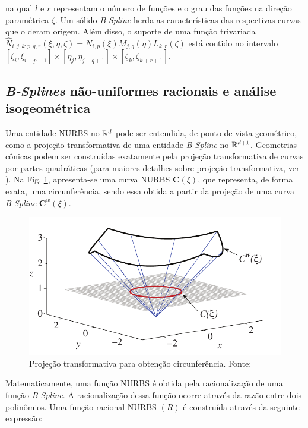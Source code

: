 \documentclass[tese_patricia]{subfiles}
\begin{document}
\noindent na qual $l$ e $r$ representam o número de funções e o grau das funções na direção paramétrica $\zeta$. Um sólido \textit{B-Spline} herda as características das respectivas curvas que o deram origem. Além disso, o suporte de uma função trivariada $\hat{N}_{i,j,k:p,q,r}\left(\xi,\eta,\zeta\right) = N_{i,p}(\xi)M_{j,q}(\eta)L_{k,r}(\zeta)$ está contido no intervalo $\left[\xi_{i},\xi_{i+p+1}\right]\times\left[\eta_{j},\eta_{j+q+1}\right]\times\left[\zeta_{k},\zeta_{k+r+1}\right]$.


\subsection{\textit{B-Splines} não-uniformes racionais e análise isogeométrica}

Uma entidade NURBS no $\mathbb{R}^{d}$ pode ser entendida, de ponto de vista geométrico, como a projeção transformativa de uma entidade \textit{B-Spline} no $\mathbb{R}^{d+1}$. Geometrias cônicas podem ser construídas exatamente pela projeção transformativa de curvas por partes quadráticas (para maiores detalhes sobre projeção transformativa, ver ). Na Fig. \ref{fig:circunferencia}, apresenta-se uma curva NURBS $\mathbf{C}\left(\xi\right)$, que representa, de forma exata, uma circunferência, sendo essa obtida a partir da projeção de uma curva \textit{B-Spline} $\mathbf{C}^{w}\left(\xi\right)$.

\begin{figure}[htb!]
	\centering 
	\includegraphics[scale=0.3,trim=0cm 0cm 0cm 0cm, clip=true]{Imagens/Cap3/transformacaoprojetiva.png}	
	\caption{Projeção transformativa para obtenção circunferência. Fonte: }
	\label{fig:circunferencia}
\end{figure}

Matematicamente, uma função NURBS é obtida pela racionalização de uma função \textit{B-Spline}. A racionalização dessa função ocorre através da razão entre dois polinômios. Uma função racional NURBS $\left(R\right)$ é construída através da seguinte expressão:
\end{document}
